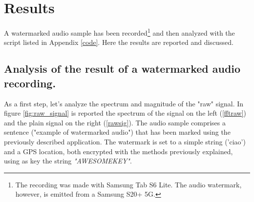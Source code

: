 \chapter{Results}
A watermarked audio sample has been recorded\footnote{The recording was made with Samsung Tab S6 Lite. The audio watermark, however, is emitted from a Samsung S20+ 5G.} and then analyzed with the script listed in Appendix \ref{code}. Here the results are reported and discussed.
\section{Analysis of the result of a watermarked audio recording.}
As a first step, let's analyze the spectrum and magnitude of the "raw" signal.
In figure \ref{fig:raw_signal} is reported the spectrum of the signal on the left (\ref{fftraw}) and the plain signal on the right (\ref{rawsig}). The audio sample comprises a sentence ("example of watermarked audio") that has been marked using the previously described application. The watermark is set to a simple string ('ciao') and a GPS location, both encrypted with the methods previously explained, using as key the string \textit{"AWESOMEKEY"}.
